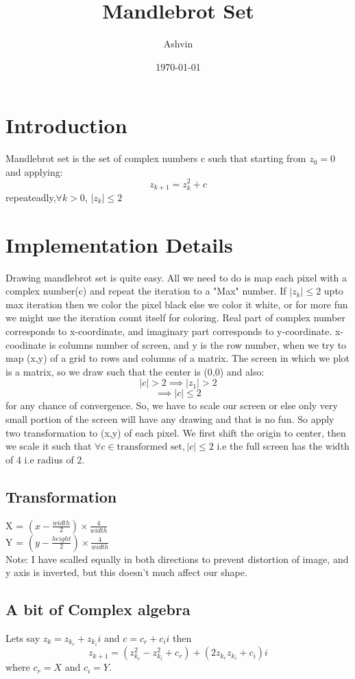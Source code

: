 \documentclass[a4paper,11pt]{article}
\author{Ashvin}
\date{\today}
\title{Mandlebrot Set}
\begin{document}
\maketitle
\tableofcontents

\newpage
\section{Introduction}
\label{sec:org75448f7}
Mandlebrot set is the set of complex numbers c such that starting from \(z_0 = 0\) and applying:
\[z_{k+1} = z_k^2+c\]
repeateadly,\(\forall k>0\), \(|z_k| \le 2\)  

\section{Implementation Details}
\label{sec:org4c12fd5}
Drawing mandlebrot set is quite easy. All we need to do is map each pixel with a complex number(c) and 
repeat the iteration to a "Max" number. If \(|z_k|\le 2\) upto max iteration then we color the pixel black
else we color it white, or for more fun we might use the iteration count itself for coloring.
Real part of complex number corresponds to x-coordinate, and imaginary part corresponds to y-coordinate.
x-coodinate is columns number of screen, and y is the row number, when we try to map (x,y) of a grid to 
rows and columns of a matrix. The screen in which we plot is a matrix, so we draw such that the center is (0,0) and 
also:
\[|c| > 2 \implies |z_1| > 2\]
\[\implies |c|\le 2\]
 for any chance of convergence.
So, we have to scale our screen or else only very small portion of the screen will have any drawing and that is
no fun. So apply two transformation to (x,y) of each pixel. We first shift the origin to center, then we scale it
such that \(\forall c \in \text{transformed set}, |c| \le 2\) i.e the full screen has the width of 4 i.e radius of 2.
\subsection{Transformation}
\label{sec:org44fbf9a}
X = \((x-\frac{width}{2})\times \frac{4}{width}\)\\
Y =  \((y-\frac{height}{2})\times \frac{4}{width}\)\\
Note: I have scalled equally in both directions to prevent distortion of image, and y axis is inverted, but this 
doesn't much affect our shape.
\subsection{A bit of Complex algebra}
\label{sec:org31da8cd}
Lets say \(z_k = z_{k_r}+z_{k_i}i\) and \(c = c_r+c_ii\) then
\[z_{k+1} = (z_{k_r}^2-z_{k_i}^2+c_r)+(2z_{k_r}z_{k_i}+c_i)i\]
where \(c_r = X\) and \(c_i = Y\).
\end{document}
